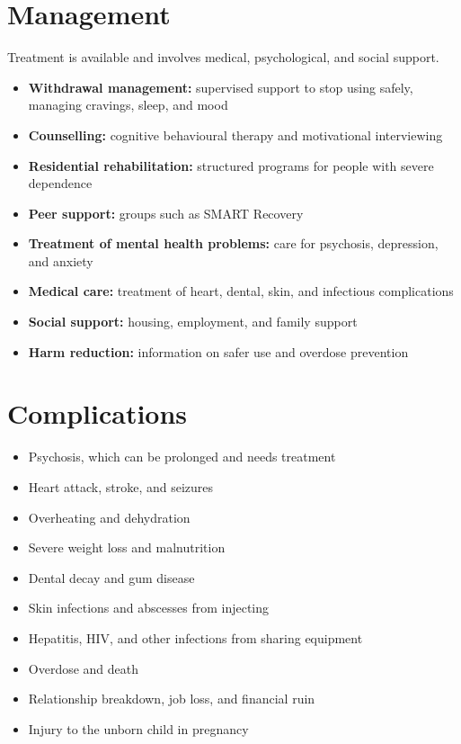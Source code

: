 \section*{Management}
Treatment is available and involves medical, psychological, and social support.

\begin{itemize}
    \item \textbf{Withdrawal management:} supervised support to stop using safely, managing cravings, sleep, and mood
    \item \textbf{Counselling:} cognitive behavioural therapy and motivational interviewing
    \item \textbf{Residential rehabilitation:} structured programs for people with severe dependence
    \item \textbf{Peer support:} groups such as SMART Recovery
    \item \textbf{Treatment of mental health problems:} care for psychosis, depression, and anxiety
    \item \textbf{Medical care:} treatment of heart, dental, skin, and infectious complications
    \item \textbf{Social support:} housing, employment, and family support
    \item \textbf{Harm reduction:} information on safer use and overdose prevention
\end{itemize}

\section*{Complications}
\begin{itemize}
    \item Psychosis, which can be prolonged and needs treatment
    \item Heart attack, stroke, and seizures
    \item Overheating and dehydration
    \item Severe weight loss and malnutrition
    \item Dental decay and gum disease
    \item Skin infections and abscesses from injecting
    \item Hepatitis, HIV, and other infections from sharing equipment
    \item Overdose and death
    \item Relationship breakdown, job loss, and financial ruin
    \item Injury to the unborn child in pregnancy
\end{itemize}

